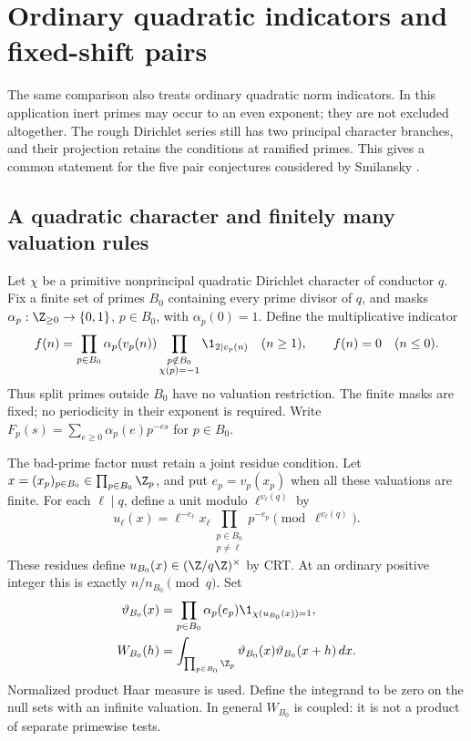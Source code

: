 \section{Ordinary quadratic indicators and fixed-shift pairs}
\label{sec:quadratic-pairs}

The same comparison also treats ordinary quadratic norm indicators.
In this application inert primes may occur to an even exponent; they
are not excluded altogether. The rough Dirichlet series still has
two principal character branches, and their projection retains the
conditions at ramified primes. This gives a common statement for
the five pair conjectures considered by Smilansky
\cite[Sections 6.1 and 6.3]{smilansky}.

\subsection{A quadratic character and finitely many valuation rules}

Let \(\chi\) be a primitive nonprincipal quadratic Dirichlet
character of conductor \(q\). Fix a finite set of primes
\(B_0\) containing every prime divisor of \(q\), and masks
\(\alpha_p:\Z_{\ge0}\to\{0,1\}\), \(p\in B_0\), with
\(\alpha_p(0)=1\). Define the multiplicative indicator
\[
 f(n)=\prod_{p\in B_0}\alpha_p(v_p(n))
       \prod_{\substack{p\notin B_0\\\chi(p)=-1}}
                                      \1_{2\mid v_p(n)}
 \quad(n\ge1),\qquad f(n)=0\quad(n\le0).
\]
Thus split primes outside \(B_0\) have no valuation restriction.
The finite masks are fixed; no periodicity in their exponent is
required. Write \(F_p(s)=\sum_{e\ge0}\alpha_p(e)p^{-es}\)
for \(p\in B_0\).

The bad-prime factor must retain a joint residue condition. Let
\(x=(x_p)_{p\in B_0}\in\prod_{p\in B_0}\Z_p\), and put
\(e_p=v_p(x_p)\) when all these valuations are finite. For each
\(\ell\mid q\), define a unit modulo \(\ell^{v_\ell(q)}\) by
\[
 u_\ell(x)=\ell^{-e_\ell}x_\ell
            \prod_{\substack{p\in B_0\\p\ne\ell}}p^{-e_p}
                                  \pmod{\ell^{v_\ell(q)}}.
\]
These residues define \(u_{B_0}(x)\in(\Z/q\Z)^\times\) by CRT.
At an ordinary positive integer this is exactly
\(n/n_{B_0}\pmod q\). Set
\begin{align}
 \vartheta_{B_0}(x)
   &=\prod_{p\in B_0}\alpha_p(e_p)
                    \1_{\chi(u_{B_0}(x))=1},\notag\\
 W_{B_0}(h)
   &=\int_{\prod_{p\in B_0}\Z_p}
             \vartheta_{B_0}(x)\vartheta_{B_0}(x+h)\,dx.
                                                        \label{eq:quadratic-bad-mass}
\end{align}
Normalized product Haar measure is used. Define the integrand to
be zero on the null sets with an infinite valuation. In general
\(W_{B_0}\) is coupled: it is not a product of separate
primewise tests.

